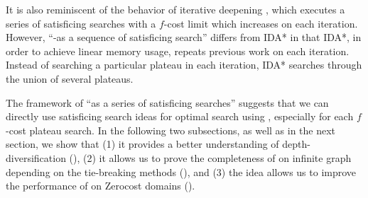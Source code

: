 % 
% 

It is also reminiscent of the behavior of iterative deepening \astar \cite{korf1985depth}, which executes a series of satisficing searches with a $f$-cost limit which increases on each iteration. However, ``\astar-as a sequence of satisficing search'' differs from IDA* in that IDA*, in order to achieve linear memory usage, repeats previous work on each iteration. Instead of searching a particular plateau in each iteration, IDA* searches through the union of several plateaus.

% 


The framework of ``\astar as a series of satisficing searches'' suggests that we can directly use satisficing search ideas for optimal search using \astar, especially for each $f$-cost plateau search.
% 
In the following two subsections, as well as in the next section, we show that (1) it provides a better understanding of depth-diversification (), (2) it allows us to prove the completeness of \astar on infinite graph depending on the tie-breaking methods (), and (3) the idea allows us to improve the performance of \astar on Zerocost domains ().

